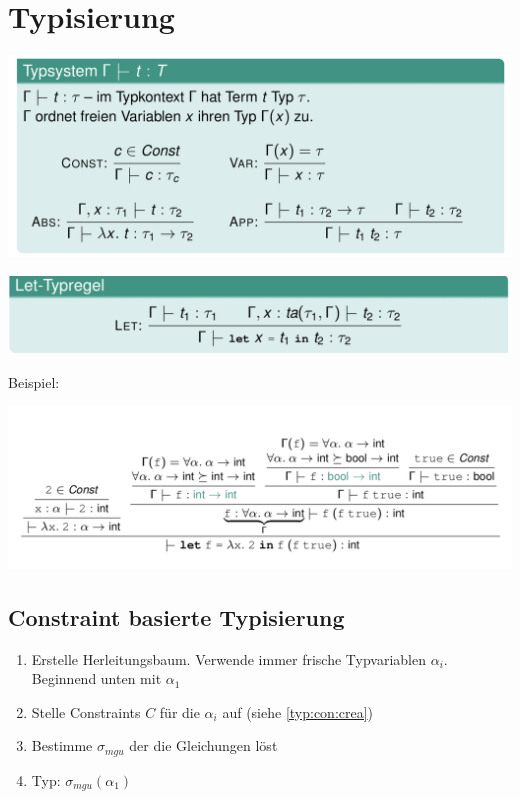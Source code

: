 \section{Typisierung}
\begin{center}
	\includegraphics[width=\columnwidth]{images/types.png}	
\end{center}
\begin{center}
		\includegraphics[width=\columnwidth]{images/let.png}
\end{center}
Beispiel:\\
\begin{center}
	\includegraphics[width=\columnwidth]{images/let_ex.png}
\end{center}
\subsection{Constraint basierte Typisierung}

\begin{enumerate}
	\item Erstelle Herleitungsbaum. Verwende immer frische Typvariablen $\alpha_i$. Beginnend unten mit $\alpha_1$
	\item Stelle Constraints $C$ für die $\alpha_i$ auf (siehe \ref{typ:con:crea})
	\item Bestimme $\sigma_{mgu}$ der die Gleichungen löst
	\item Typ: $\sigma_{mgu}(\alpha_1)$
\end{enumerate}

